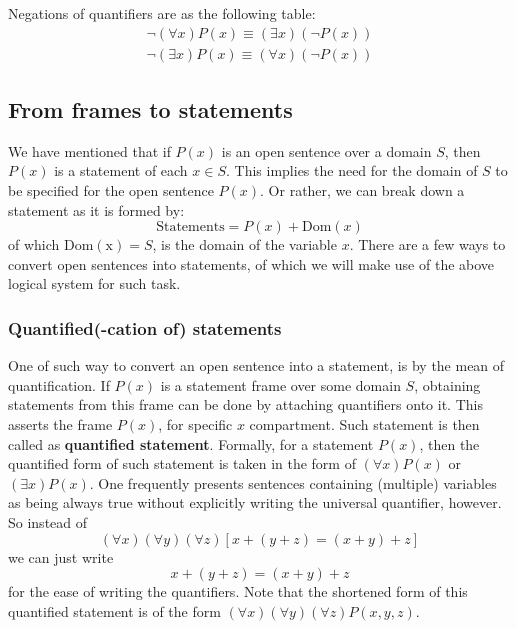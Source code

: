 Negations of quantifiers are as the following table:
\begin{align}
    \lnot(\forall x)P(x)\equiv (\exists x)(\lnot P(x)) \\
    \lnot (\exists x)P(x) \equiv (\forall x)(\lnot P(x))
\end{align}
\subsection{From frames to statements}

We have mentioned that if $P(x)$ is an open sentence over a domain $S$, then $P(x)$ is a statement of each $x\in S$. This implies the need for the domain of $S$ to be specified for the open sentence $P(x)$. Or rather, we can break down a statement as it is formed by: 
\begin{equation}
    \text{Statements} = P(x) + \mathrm{Dom}(x)
\end{equation}
of which $\mathrm{Dom(x)}=S$, is the domain of the variable $x$. There are a few ways to convert open sentences into statements, of which we will make use of the above logical system for such task. 
\subsubsection{Quantified(-cation of) statements}
One of such way to convert an open sentence into a statement, is by the mean of  quantification. If $P(x)$ is a statement frame over some domain $S$, obtaining statements from this frame can be done by attaching quantifiers onto it. This asserts the frame $P(x)$, for specific $x$ compartment. Such statement is then called as  \textbf{quantified statement}. Formally, for a statement $P(x)$, then the quantified form of such statement is taken in the form of $(\forall x) P(x)$ or $(\exists x)P(x)$. One frequently presents sentences containing (multiple) variables as being always true without explicitly writing the universal quantifier, however. So instead of 
\begin{equation*}
    (\forall x) (\forall y) (\forall z) [x+(y+z)=(x+y)+z]
\end{equation*}
we can just write
\begin{equation*}
    x+(y+z)=(x+y)+z
\end{equation*}
for the ease of writing the quantifiers. Note that the shortened form of this quantified statement is of the form $(\forall x)(\forall y)(\forall z)P(x,y,z)$. 

